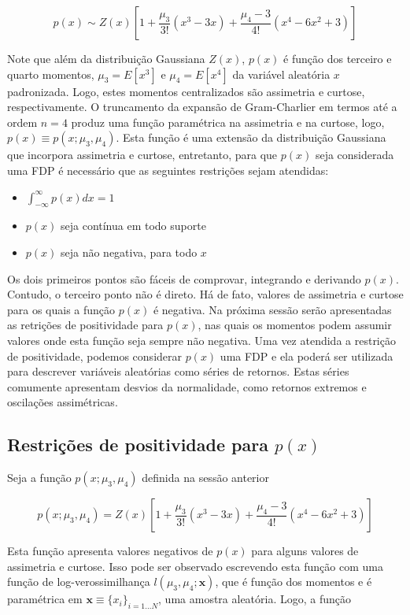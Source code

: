 \documentclass[]{article}
\providecommand{\tightlist}{%
  \setlength{\itemsep}{0pt}\setlength{\parskip}{0pt}}
\begin{document}
\[
p(x) \sim Z(x)\left[ 1 + \frac{\mu_3}{3!} (x^3 - 3x) + \frac{\mu_4 - 3}{4!} (x^4 - 6x^2 + 3) \right]
\]

Note que além da distribuição Gaussiana \(Z(x)\), \(p(x)\) é função dos
terceiro e quarto momentos, \(\mu_3 = E[x^3]\) e \(\mu_4 = E[x^4]\) da
variável aleatória \(x\) padronizada. Logo, estes momentos centralizados
são assimetria e curtose, respectivamente. O truncamento da expansão de
Gram-Charlier em termos até a ordem \(n=4\) produz uma função
paramétrica na assimetria e na curtose, logo,
\(p(x) \equiv p(x;\mu_3,\mu_4)\). Esta função é uma extensão da
distribuição Gaussiana que incorpora assimetria e curtose, entretanto,
para que \(p(x)\) seja considerada uma FDP é necessário que as seguintes
restrições sejam atendidas:

\begin{itemize}
\tightlist
\item
  \(\int_{-\infty}^{\infty}p(x) dx = 1\)
\item
  \(p(x)\) seja contínua em todo suporte
\item
  \(p(x)\) seja não negativa, para todo \(x\)
\end{itemize}

Os dois primeiros pontos são fáceis de comprovar, integrando e derivando
\(p(x)\). Contudo, o terceiro ponto não é direto. Há de fato, valores de
assimetria e curtose para os quais a função \(p(x)\) é negativa. Na
próxima sessão serão apresentadas as retrições de positividade para
\(p(x)\), nas quais os momentos podem assumir valores onde esta função
seja sempre não negativa. Uma vez atendida a restrição de positividade,
podemos considerar \(p(x)\) uma FDP e ela poderá ser utilizada para
descrever variáveis aleatórias como séries de retornos. Estas séries
comumente apresentam desvios da normalidade, como retornos extremos e
oscilações assimétricas.

\subsection{\texorpdfstring{Restrições de positividade para
\(p(x)\)}{Restrições de positividade para p(x)}}\label{restricoes-de-positividade-para-px}

Seja a função \(p(x;\mu_3, \mu_4)\) definida na sessão anterior

\[
p(x; \mu_3, \mu_4) = Z(x)\left[ 1 + \frac{\mu_3}{3!} (x^3 - 3x) + \frac{\mu_4 - 3}{4!} (x^4 - 6x^2 + 3) \right]
\]

Esta função apresenta valores negativos de \(p(x)\) para alguns valores
de assimetria e curtose. Isso pode ser observado escrevendo esta função
com uma função de log-verossimilhança \(l(\mu_3, \mu_4; \mathbf{x})\),
que é função dos momentos e é paramétrica em
\(\mathbf{x} \equiv \{x_i\}_{i=1...N}\), uma amostra aleatória. Logo, a
função
\end{document}
